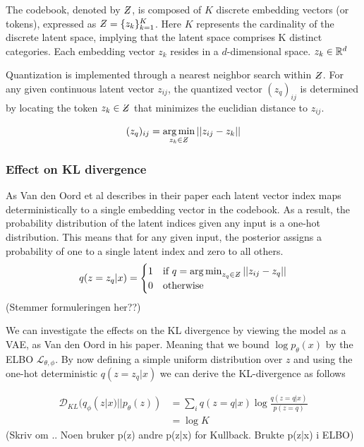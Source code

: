 The codebook, denoted by $\Zstroke$, is composed of $K$ discrete embedding vectors (or tokens), expressed as $\Zstroke = \{z_k\}_{k=1}^K$. Here $K$ represents the cardinality of the discrete latent space,
implying that the latent space comprises K distinct categories. Each embedding vector $z_k$ resides in a $d$-dimensional space. $z_k \in \mathbb{R}^d$

Quantization is implemented through a nearest neighbor search within $\Zstroke$. For any given continuous latent vector $z_{ij}$, the quantized vector $(z_q)_{ij}$ is determined by locating the token $z_k \in \Zstroke$ that minimizes the euclidian distance to $z_{ij}$.

$$(z_q)_{ij} = \argmin_{z_k \in \Zstroke}|| z_{ij} - z_k ||$$

\subsubsection{Effect on KL divergence}
As Van den Oord et al describes in their paper \cite{neuvqvae} each latent vector index maps deterministically to a single embedding vector in the codebook. As a result, the probability distribution of the latent indices given any input is a one-hot distribution. 
This means that for any given input, the posterior assigns a probability of one to a single latent index and zero to all others. 
\begin{equation}
    q(z = z_q | x) =
    \begin{cases}
    1 & \text{if } q = \argmin_{z_q \in \Zstroke} || z_{ij} - z_q || \\
    0 & \text{otherwise}
    \end{cases}
\end{equation}
(Stemmer formuleringen her??)

We can investigate the effects on the KL divergence by viewing the model as a VAE, as Van den Oord in his paper. Meaning that we bound $\log p_\theta(x)$ by the ELBO $\mathcal{L}_{\theta, \phi}$.
By now defining a simple uniform distribution over $z$ and using the one-hot deterministic $q(z=z_q|x)$ we can derive the KL-divergence as follows

\begin{equation}
    \begin{aligned}
        \mathcal{D}_{KL}(q_\phi(z|x) || p_\theta(z)) &= \sum_i q(z=q|x) \log \frac{ q(z=q|x)}{p(z=q)} \\
        &= \log K
    \end{aligned}
\end{equation}
(Skriv om .. Noen bruker p(z) andre p(z|x) for Kullback. Brukte p(z|x) i ELBO)

